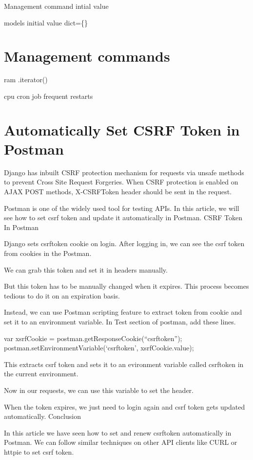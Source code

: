 \documentclass[a5paper,10pt,english]{sphinxmanual}
\begin{document}
Management command
intial value

models initial value
dict=\{\}


\chapter{Management commands}
\label{\detokenize{misc_management_commands:management-commands}}\label{\detokenize{misc_management_commands::doc}}
ram
.iterator()

cpu
cron job
frequent restarts


\chapter{Automatically Set CSRF Token in Postman}
\label{\detokenize{misc_postman_csrf_token:automatically-set-csrf-token-in-postman}}\label{\detokenize{misc_postman_csrf_token::doc}}
Django has inbuilt CSRF protection mechanism for requests via unsafe methods to prevent Cross Site Request Forgeries. When CSRF protection is enabled on AJAX POST methods, X-CSRFToken header should be sent in the request.

Postman is one of the widely used tool for testing APIs. In this article, we will see how to set csrf token and update it automatically in Postman.
CSRF Token In Postman

Django sets csrftoken cookie on login. After logging in, we can see the csrf token from cookies in the Postman.

We can grab this token and set it in headers manually.

But this token has to be manually changed when it expires. This process becomes tedious to do it on an expiration basis.

Instead, we can use Postman scripting feature to extract token from cookie and set it to an environment variable. In Test section of postman, add these lines.

var xsrfCookie = postman.getResponseCookie(“csrftoken”);
postman.setEnvironmentVariable(‘csrftoken’, xsrfCookie.value);

This extracts csrf token and sets it to an evironment variable called csrftoken in the current environment.

Now in our requests, we can use this variable to set the header.

When the token expires, we just need to login again and csrf token gets updated automatically.
Conclusion

In this article we have seen how to set and renew csrftoken automatically in Postman. We can follow similar techniques on other API clients like CURL or httpie to set csrf token.
\end{document}
